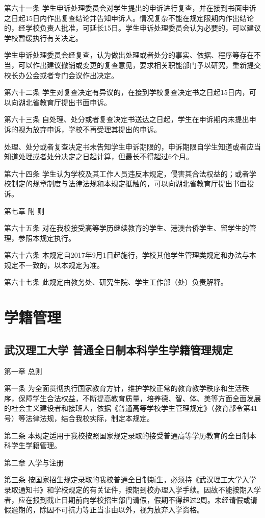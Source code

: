 \documentclass[UTF8,12pt,a4paper]{report}
\begin{document}
第六十一条 学生申诉处理委员会对学生提出的申诉进行复查，并在接到书面申诉之日起15日内作出复查结论并告知申诉人。情况复杂不能在规定限期内作出结论的，经学校负责人批准，可延长15日。学生申诉处理委员会认为必要的，可以建议学校暂缓执行有关决定。

学生申诉处理委员会经复查，认为做出处理或者处分的事实、依据、程序等存在不当，可以作出建议撤销或变更的复查意见，要求相关职能部门予以研究，重新提交校长办公会或者专门会议作出决定。

第六十二条 学生对复查决定有异议的，在接到学校复查决定书之日起15日内，可以向湖北省教育厅提出书面申诉。

第六十三条 自处理、处分或者复查决定书送达之日起，学生在申诉期内未提出申诉的视为放弃申诉，学校不再受理其提出的申诉。

处理、处分或者复查决定书未告知学生申诉期限的，申诉期限自学生知道或者应当知道处理或者处分决定之日起计算，但最长不得超过6个月。

第六十四条 学生认为学校及其工作人员违反本规定，侵害其合法权益的；或者学校制定的规章制度与法律法规和本规定抵触的，可以向湖北省教育厅提出书面投诉。



第七章 附 则

第六十五条 对在我校接受高等学历继续教育的学生、港澳台侨学生、留学生的管理，参照本规定执行。

第六十六条  本规定自2017年9月1日起施行，学校其他学生管理类规定和办法与本规定不一致的，以本规定为准。

第六十七条  此规定由教务处、研究生院、学生工作部（处）负责解释。
	\part{学籍管理}
		\chapter{武汉理工大学 普通全日制本科学生学籍管理规定}
第一章  总则

第一条  为全面贯彻执行国家教育方针，维护学校正常的教育教学秩序和生活秩序，保障学生合法权益，不断提高教育质量，培养德、智、体、美等方面全面发展的社会主义建设者和接班人，依据《普通高等学校学生管理规定》（教育部令第41号）等法律法规，结合我校实际，制定本规定。

第二条  本规定适用于我校按照国家规定录取的接受普通高等学历教育的全日制本科学生学籍管理。



第二章 入学与注册

第三条  按国家招生规定录取的我校普通全日制新生，必须持《武汉理工大学入学录取通知书》和学校规定的有关证件，按期到校办理入学手续。因故不能按期入学者，应在报到截止日期前向学校招生部门请假，假期不得超过2周。未经请假或请假逾期的，除因不可抗力等正当事由以外，视为放弃入学资格。
\end{document}

